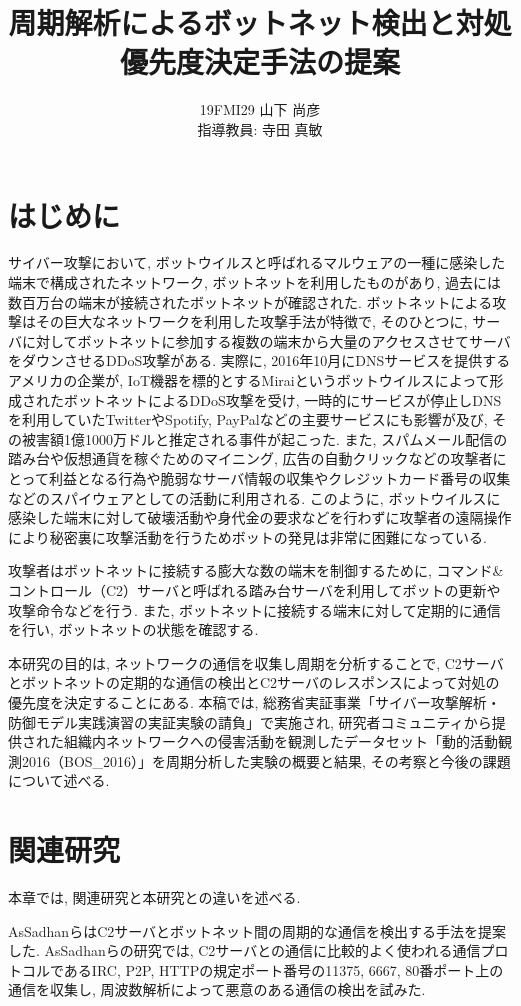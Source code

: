 \documentclass[twocolumn,9pt]{ltjsarticle}
\title{周期解析によるボットネット検出と対処優先度決定手法の提案}
\author{19FMI29 山下 尚彦 \\ 指導教員: 寺田 真敏}
\date{}
\begin{document}
\maketitle

\section{はじめに}
サイバー攻撃において, ボットウイルスと呼ばれるマルウェアの一種に感染した端末で構成されたネットワーク, ボットネットを利用したものがあり, 過去には数百万台の端末が接続されたボットネットが確認された. ボットネットによる攻撃はその巨大なネットワークを利用した攻撃手法が特徴で, そのひとつに, サーバに対してボットネットに参加する複数の端末から大量のアクセスさせてサーバをダウンさせるDDoS攻撃がある. 実際に, 2016年10月にDNSサービスを提供するアメリカの企業が, IoT機器を標的とするMiraiというボットウイルスによって形成されたボットネットによるDDoS攻撃を受け, 一時的にサービスが停止しDNSを利用していたTwitterやSpotify, PayPalなどの主要サービスにも影響が及び, その被害額1億1000万ドルと推定される事件が起こった. また, スパムメール配信の踏み台や仮想通貨を稼ぐためのマイニング, 広告の自動クリックなどの攻撃者にとって利益となる行為や脆弱なサーバ情報の収集やクレジットカード番号の収集などのスパイウェアとしての活動に利用される. このように, ボットウイルスに感染した端末に対して破壊活動や身代金の要求などを行わずに攻撃者の遠隔操作により秘密裏に攻撃活動を行うためボットの発見は非常に困難になっている. 

攻撃者はボットネットに接続する膨大な数の端末を制御するために, コマンド\&コントロール（C2）サーバと呼ばれる踏み台サーバを利用してボットの更新や攻撃命令などを行う. また, ボットネットに接続する端末に対して定期的に通信を行い, ボットネットの状態を確認する. 

本研究の目的は, ネットワークの通信を収集し周期を分析することで, C2サーバとボットネットの定期的な通信の検出とC2サーバのレスポンスによって対処の優先度を決定することにある. 本稿では, 総務省実証事業「サイバー攻撃解析・防御モデル実践演習の実証実験の請負」で実施され, 研究者コミュニティから提供された組織内ネットワークへの侵害活動を観測したデータセット「動的活動観測2016（BOS\_2016）」\cite{マルウェア対策研42:online}を周期分析した実験の概要と結果, その考察と今後の課題について述べる. 

\section{関連研究}
本章では, 関連研究と本研究との違いを述べる. 

AsSadhanらはC2サーバとボットネット間の周期的な通信を検出する手法を提案した\cite{assadhan2018analysis}. AsSadhanらの研究では, C2サーバとの通信に比較的よく使われる通信プロトコルであるIRC, P2P, HTTPの規定ポート番号の11375, 6667, 80番ポート上の通信を収集し, 周波数解析によって悪意のある通信の検出を試みた. 
\end{document}
